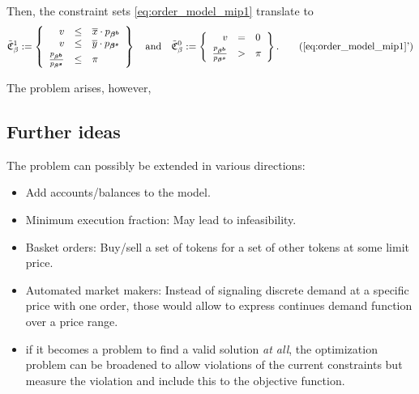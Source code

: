 \documentclass[11pt,parskip=full]{scrartcl}%
\newcommand*{\Min}{\mathrm{min}}
\begin{document}
Then, the constraint sets \eqref{eq:order_model_mip1} translate to
\begin{align}
  \tilde{\mathfrak{C}}^1_\beta := \left\{
  \begin{array}{rlll}
    v &\le & \overline{x} \cdot p_{\bm{\beta^b}} \\
    v &\le & \overline{y} \cdot p_{\bm{\beta^s}} \\[1mm]
    \frac{p_{\bm{\beta^b}}}{p_{\bm{\beta^s}}} &\le & \pi
  \end{array}
  \right\}
  \quad
  \text{and}
  \quad
  \tilde{\mathfrak{C}}^0_\beta := \left\{
  \begin{array}{rll}
    v &= & 0 \\[1mm]
    \frac{p_{\bm{\beta^b}}}{p_{\bm{\beta^s}}} &> & \pi
  \end{array}
  \right\}.
  \tag{\ref{eq:order_model_mip1}'}
  \label{eq:basket_order_model_mip1}
\end{align}

The problem arises, however, 



\newpage
\subsection{Further ideas}

The problem can possibly be extended in various directions:
\begin{itemize}
  \item Add accounts/balances to the model.
  \item Minimum execution fraction: May lead to infeasibility.
  \item Basket orders: Buy/sell a set of tokens for a set of other tokens at some limit price.
  \item Automated market makers: Instead of signaling discrete demand at a specific price with one
  order, those would allow to express continues demand function over a price range.
  \item if it becomes a problem to find a valid solution \emph{at all}, the optimization problem can
  be broadened to allow violations of the current constraints but measure the violation and
  include this to the objective function.
\end{itemize}
\end{document}
